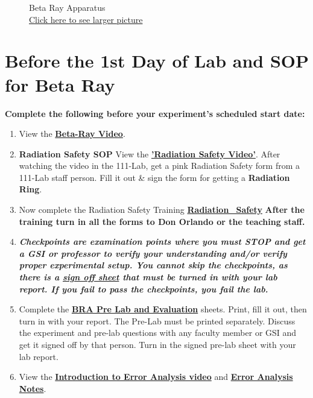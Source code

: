 \documentclass{../lab}
\begin{document}
\begin{figure}[!h]
  \caption{Beta Ray Apparatus\\ \href{http://experimentationlab.berkeley.edu/sites/default/files/images/BRA_Rack_1.jpg}{Click here to see larger picture}}\label{fig:BRayApparatus}
\endminipage
\end{figure}

\section{Before the 1st Day of Lab and SOP for Beta Ray}

\textbf{Complete the following before your experiment's scheduled start date:}

\begin{enumerate}
    \item View the \href{http://youtu.be/qJ4MPtMmFPw}{\textbf{Beta-Ray Video}}.

    \item \textbf{Radiation Safety SOP} View the \href{http://youtu.be/KHxtzF5pZZM}{\textbf{'Radiation Safety Video'}}. After watching the video in the 111-Lab, get a pink Radiation Safety form from a 111-Lab staff person. Fill it out \& sign the form for getting a \textbf{Radiation Ring}.

    \item Now complete the Radiation Safety Training \href{http://experimentationlab.berkeley.edu/RadiationSafety}{\textbf{Radiation\_Safety}} \textbf{After the training turn in all the forms to Don Orlando or the teaching staff.}
    
    \item \emph{\textbf{Checkpoints are examination points where you must STOP and get a GSI or professor to verify your understanding and/or verify proper experimental setup. You cannot skip the checkpoints, as there is a \href{http://experimentationlab.berkeley.edu/bracheckpoints}{\textbf{sign off sheet}} that must be turned in with your lab report. If you fail to pass the checkpoints, you fail the lab.}} 

    \item Complete the \href{http://experimentationlab.berkeley.edu/BRAPreLab}{\textbf{BRA Pre Lab and Evaluation}} sheets. Print, fill it out, then turn in with your report. The Pre-Lab must be printed separately. Discuss the experiment and pre-lab questions with any faculty member or GSI and get it signed off by that person. Turn in the signed pre-lab sheet with your lab report.

    \item View the \href{\ErrorAnalysisVideo}{\textbf{Introduction to Error Analysis video}} and \href{\ErrorAnalysisNotes}{\textbf{\textbf{Error Analysis Notes}}}.


\end{enumerate}
\end{document}
